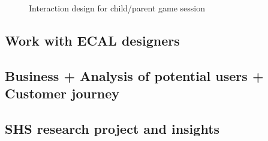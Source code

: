 \begin{figure}[H]
    \centering
    \hfill
    \hfill
    \caption{Interaction design for child/parent game session } 
    \label{fig:game_id}
\end{figure}



\subsection{Work with ECAL designers}
\subsection{Business + Analysis of potential users + Customer journey}
\subsection{SHS research project and insights}
